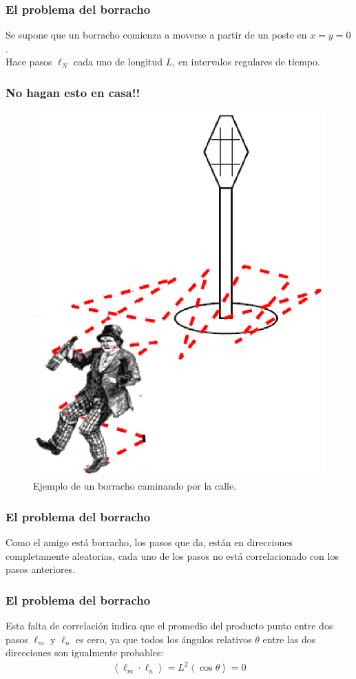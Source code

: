 \documentclass[12pt]{beamer}
\begin{document}
\begin{frame}
\frametitle{El problema del borracho}
Se supone que un borracho comienza a moverse a partir de un poste en $x = y = 0$.
\\
\bigskip
\pause
Hace pasos $\ell_{N}$ cada uno de longitud $L$, en intervalos regulares de tiempo.
\end{frame}
\begin{frame}
\frametitle{No hagan esto en casa!!}
\begin{figure}
	\centering
	\includegraphics[scale=0.35]{Imagenes/Borracho_03.eps}
	\caption{Ejemplo de un borracho caminando por la calle.}
\end{figure}
\end{frame}
\begin{frame}
\frametitle{El problema del borracho}
Como el amigo está borracho, los pasos que da, están en direcciones completamente aleatorias, cada uno de los pasos no está correlacionado con los pasos anteriores.
\end{frame}
\begin{frame}
\frametitle{El problema del borracho}
Esta falta de correlación indica que el promedio del producto punto entre dos pasos $\ell_{m}$ y $\ell_{n}$ es cero, ya que todos los ángulos relativos $\theta$ entre las dos direcciones son igualmente probables:
\pause
\begin{align*}
\left\langle \ell_{m} \cdot \ell_{n} \right\rangle = L^{2} \left\langle \cos \theta \right\rangle = 0
\end{align*}
\end{frame}
\end{document}
